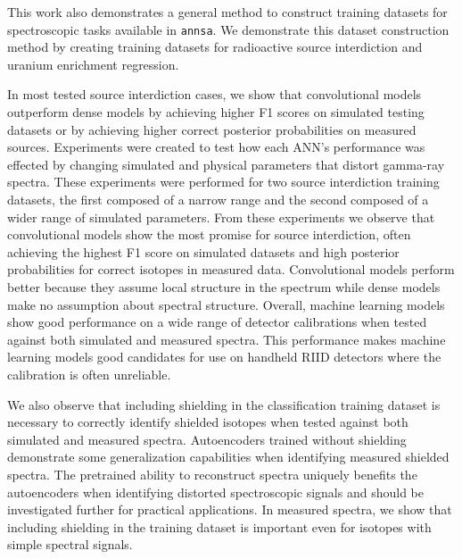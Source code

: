 This work also demonstrates a general method to construct training datasets for spectroscopic tasks available in \verb|annsa|. We demonstrate this dataset construction method by creating training datasets for radioactive source interdiction and uranium enrichment regression. 

In most tested source interdiction cases, we show that convolutional models outperform dense models by achieving higher F1 scores on simulated testing datasets or by achieving higher correct posterior probabilities on measured sources. Experiments were created to test how each ANN's performance was effected by changing simulated and physical parameters that distort gamma-ray spectra. These experiments were performed for two source interdiction training datasets, the first composed of a narrow range and the second composed of a wider range of simulated parameters. From these experiments we observe that convolutional models show the most promise for source interdiction, often achieving the highest F1 score on simulated datasets and high posterior probabilities for correct isotopes in measured data. Convolutional models perform better because they assume local structure in the spectrum while dense models make no assumption about spectral structure. Overall, machine learning models show good performance on a wide range of detector calibrations when tested against both simulated and measured spectra. This performance makes machine learning models good candidates for use on handheld RIID detectors where the calibration is often unreliable.

We also observe that including shielding in the classification training dataset is necessary to correctly identify shielded isotopes when tested against both simulated and measured spectra. Autoencoders trained without shielding demonstrate some generalization capabilities when identifying measured shielded spectra. The pretrained ability to reconstruct spectra uniquely benefits the autoencoders when identifying distorted spectroscopic signals and should be investigated further for practical applications. In measured spectra, we show that including shielding in the training dataset is important even for isotopes with simple spectral signals. %

